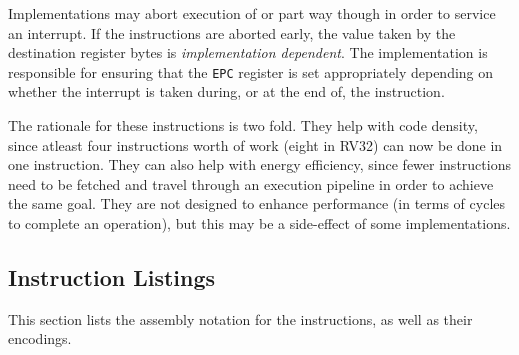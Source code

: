 Implementations may abort execution of  or  part way
though in order to service an interrupt. If the instructions are aborted
early, the value taken by the destination register bytes is {\em
implementation dependent}. The implementation is responsible for ensuring
that the {\tt EPC} register is set appropriately depending on whether the
interrupt is taken during, or at the end of, the instruction.

The rationale for these instructions is two fold. They help with code density,
since atleast four instructions worth of work (eight in RV32) can now be done
in one instruction. They can also help with energy efficiency, since fewer
instructions need to be fetched and travel through an execution pipeline in
order to achieve the same goal. They are not designed to enhance performance
(in terms of cycles to complete an operation), but this may be a side-effect
of some implementations.

\newpage
\subsection{Instruction Listings}

This section lists the assembly notation for the instructions, as well as
their encodings.

